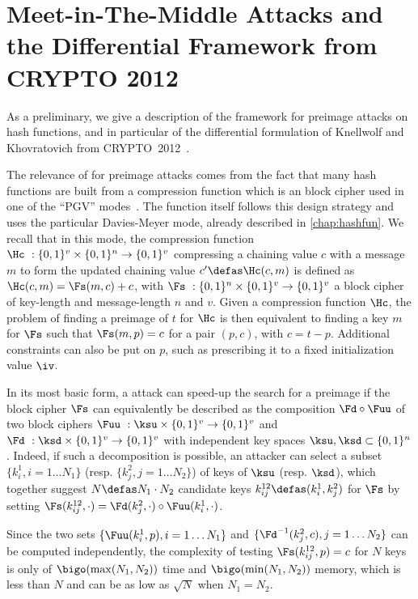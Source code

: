 \section{Meet-in-The-Middle Attacks and the Differential Framework from CRYPTO 2012}
\label{KKFramework}

As a preliminary, we give a description of the \mitm framework for preimage attacks on hash functions,
and in particular of the differential formulation of Knellwolf and Khovratovich from CRYPTO~2012~\cite{DBLP:conf/crypto/KnellwolfK12}.

The relevance of \mitm for preimage attacks comes from the fact that many hash functions are built from a compression
function which is an \ah block cipher used in one of the ``PGV'' modes~\cite{PGV93}.
The \shaone function itself follows this design strategy and uses the particular Davies-Meyer mode, already described
in \autoref{chap:hashfun}.
We recall that in this mode, the compression function $\Hc~: \{0, 1\}^v \times \{0, 1\}^n \rightarrow \{0, 1\}^v$ compressing a chaining value $c$ with
a message $m$ to form the updated chaining value $c' \defas \Hc(c, m)$ is defined as $\Hc(c, m) = \Fs(m, c) + c$, with
$\Fs~: \{0, 1\}^n \times \{0, 1\}^v \rightarrow \{0, 1\}^v$ a block cipher of key-length and message-length $n$ and $v$.
Given a compression function $\Hc$,
the problem of finding a preimage of $t$ for $\Hc$ is then equivalent to finding a key $m$ for
$\Fs$
such that $\Fs(m, p) = c$ for a pair $(p, c)$, with $c = t - p$. Additional constraints can also be put on $p$, such as prescribing
it to a fixed initialization value $\iv$.

In its most basic form, a \mitm attack can speed-up the search for a preimage if the block cipher $\Fs$ can equivalently be
described as the composition $\Fd \circ \Fuu$ of two block ciphers $\Fuu~: \ksu \times \{0, 1\}^v
\rightarrow \{0, 1\}^v$ and $\Fd~: \ksd \times \{0, 1\}^v\rightarrow \{0, 1\}^v$ with independent key spaces $\ksu, \ksd \subset \{0,1\}^n$.
Indeed, if such a decomposition is possible, an attacker can select a subset $\{k^1_i, i = 1\ldots N_1\}$ (resp. $\{k^2_j, j = 1\ldots N_2\}$)
of keys of $\ksu$ (resp. $\ksd$), which
together suggest $N \defas N_1 \cdot N_2$ candidate keys $k^{12}_{ij} \defas (k^1_i, k^2_j)$ for $\Fs$ by setting
$\Fs(k^{12}_{ij},\cdot) = \Fd(k^2_j,\cdot) \circ \Fuu(k^1_i,\cdot)$.

Since the two sets $\{\Fuu(k^1_i, p), i = 1\ldots N_1\}$ and $\{\Fd^{-1}(k^2_j, c), j = 1\ldots N_2\}$ can be computed  independently, the complexity
of testing $\Fs(k^{12}_{ij},p) = c$ for
$N$ keys is only of $\bigo(\max(N_1, N_2))$ time and $\bigo(\min(N_1, N_2))$ memory, which is less than $N$
and can be as low as $\sqrt{N}$ when $N_1 = N_2$.

